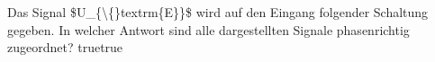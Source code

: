     {Das Signal \$U\_\{\textbackslash\{\}textrm\{E\}\}\$ wird auf den Eingang folgender Schaltung gegeben. In welcher Antwort sind alle dargestellten Signale phasenrichtig zugeordnet?}
    {}
    {}
    {}
    {}
    {true}{true}